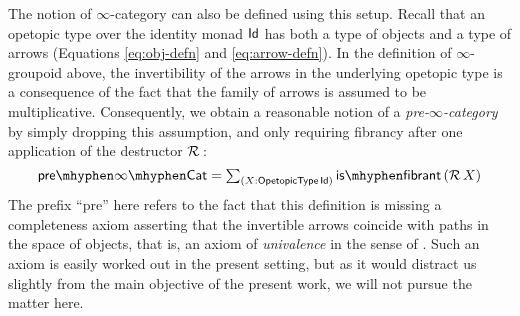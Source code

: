 The notion of $\infty$-category can also be defined using this setup.
Recall that an opetopic type over the identity monad $\mathsf{Id}$ has both a
type of objects and a type of arrows (Equations \ref{eq:obj-defn} and
\ref{eq:arrow-defn}).  In the definition of $\infty$-groupoid above,
the invertibility of the arrows in the underlying opetopic type is a
consequence of the fact that the family of arrows is assumed to be
multiplicative.  Consequently, we obtain a reasonable notion of a
\emph{pre-$\infty$-category} by simply dropping this assumption, and
only requiring fibrancy after one application of the destructor
$\mathcal{R}\,$:
\[ \preooCat = \dsum{X : \OpType \Id} \isfibrant (\Rel X) \] The
prefix ``pre'' here refers to the fact that this definition is missing
a completeness axiom asserting that the invertible arrows coincide
with paths in the space of objects, that is, an axiom of
\emph{univalence} in the sense of \cite{ahrens2015univalent}.  Such an
axiom is easily worked out in the present setting, but as it would
distract us slightly from the main objective of the present work, we
will not pursue the matter here.
